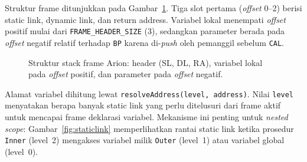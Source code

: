 \documentclass[11pt,a4paper]{article}
\begin{document}
Struktur frame ditunjukkan pada Gambar~\ref{fig:frame}. Tiga slot pertama
(\textit{offset} 0--2) berisi static link, dynamic link, dan return address.
Variabel lokal menempati \textit{offset} positif mulai dari
\texttt{FRAME\_HEADER\_SIZE} (3), sedangkan parameter berada pada \textit{offset}
negatif relatif terhadap \texttt{BP} karena di-\textit{push} oleh pemanggil
sebelum \texttt{CAL}.

\begin{figure}[H]
\centering
{}
\caption{Struktur stack frame Arion: header (SL, DL, RA), variabel lokal pada
\textit{offset} positif, dan parameter pada \textit{offset} negatif.}
\label{fig:frame}
\end{figure}

Alamat variabel dihitung lewat \texttt{resolveAddress(level, address)}. Nilai
\texttt{level} menyatakan berapa banyak static link yang perlu ditelusuri dari
frame aktif untuk mencapai frame deklarasi variabel. Mekanisme ini penting untuk
\textit{nested scope}: Gambar~\ref{fig:staticlink} memperlihatkan rantai static
link ketika prosedur \texttt{Inner} (level~2) mengakses variabel milik
\texttt{Outer} (level~1) atau variabel global (level~0).
\end{document}
